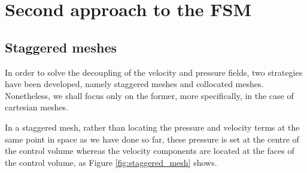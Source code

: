 
\section{Second approach to the FSM}

\subsection{Staggered meshes}

In order to solve the decoupling of the velocity and pressure fields, two strategies have been developed, namely staggered meshes and collocated meshes. Nonetheless, we shall focus only on the former, more specifically, in the case of cartesian meshes. 

In a staggered mesh, rather than locating the pressure and velocity terms at the same point in space as we have done so far, these pressure is set at the centre of the control volume whereas the velocity components are located at the faces of the control volume, as Figure \ref{fig:staggered_mesh} shows.

